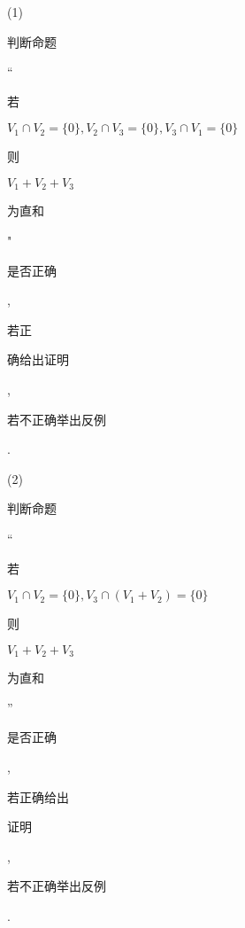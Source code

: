 \documentclass[10pt]{article}
\begin{document}
(1) \begin{CJK}{UTF8}{mj}判断命题\end{CJK} “\begin{CJK}{UTF8}{mj}若\end{CJK} $V_{1} \cap V_{2}=\{0\}, V_{2} \cap V_{3}=\{0\}, V_{3} \cap V_{1}=\{0\}$ \begin{CJK}{UTF8}{mj}则\end{CJK} $V_{1}+V_{2}+V_{3}$ \begin{CJK}{UTF8}{mj}为直和\end{CJK}" \begin{CJK}{UTF8}{mj}是否正确\end{CJK}, \begin{CJK}{UTF8}{mj}若正\end{CJK} \begin{CJK}{UTF8}{mj}确给出证明\end{CJK}, \begin{CJK}{UTF8}{mj}若不正确举出反例\end{CJK}.

(2) \begin{CJK}{UTF8}{mj}判断命题\end{CJK} “\begin{CJK}{UTF8}{mj}若\end{CJK} $V_{1} \cap V_{2}=\{0\}, V_{3} \cap\left(V_{1}+V_{2}\right)=\{0\}$ \begin{CJK}{UTF8}{mj}则\end{CJK} $V_{1}+V_{2}+V_{3}$ \begin{CJK}{UTF8}{mj}为直和\end{CJK}” \begin{CJK}{UTF8}{mj}是否正确\end{CJK}, \begin{CJK}{UTF8}{mj}若正确给出\end{CJK} \begin{CJK}{UTF8}{mj}证明\end{CJK}, \begin{CJK}{UTF8}{mj}若不正确举出反例\end{CJK}.
\end{document}
